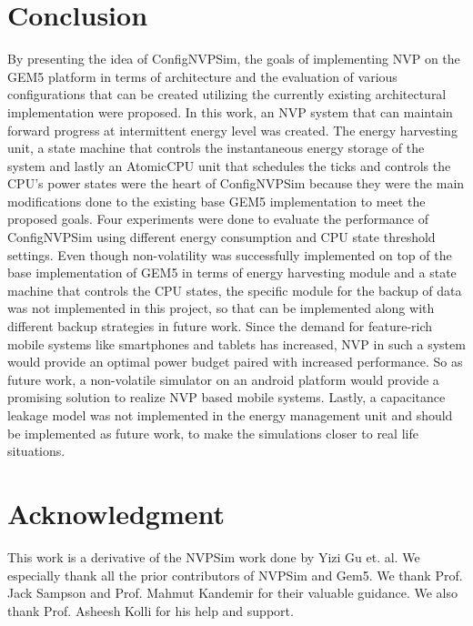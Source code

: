 \documentclass[conference]{IEEEtran}
\begin{document}
\section*{\textbf{Conclusion}}
By presenting the idea of ConfigNVPSim, the goals of implementing NVP on the GEM5 platform in terms of architecture and the evaluation of various configurations that can be created utilizing the currently existing architectural implementation were proposed. In this work, an NVP system that can maintain forward progress at intermittent energy level was created. The energy harvesting unit, a state machine that controls the instantaneous energy storage of the system and lastly an AtomicCPU unit that schedules the ticks and controls the CPU's power states were the heart of ConfigNVPSim because they were the main modifications done to the existing base GEM5 implementation to meet the proposed goals. Four experiments were done to evaluate the performance of ConfigNVPSim using different energy consumption and CPU state threshold settings. 
Even though non-volatility was successfully implemented on top of the base implementation of GEM5 in terms of energy harvesting module and a state machine that controls the CPU states, the specific module for the backup of data was not implemented in this project, so that can be implemented along with different backup strategies in future work. Since the demand for feature-rich mobile systems like smartphones and tablets has increased, NVP in such a system would provide an optimal power budget paired with increased performance. So as future work, a non-volatile simulator on an android platform would provide a promising solution to realize NVP based mobile systems. Lastly, a capacitance leakage model was not implemented in the energy management unit and should be implemented as future work, to make the simulations closer to real life situations. 

\section*{\textbf{Acknowledgment}}

This work is a derivative of the NVPSim work done by Yizi Gu et. al. We especially thank all the prior contributors of NVPSim and Gem5. We thank Prof. Jack Sampson and Prof. Mahmut Kandemir for their valuable guidance. We also thank Prof. Asheesh Kolli for his help and support.
\end{document}
